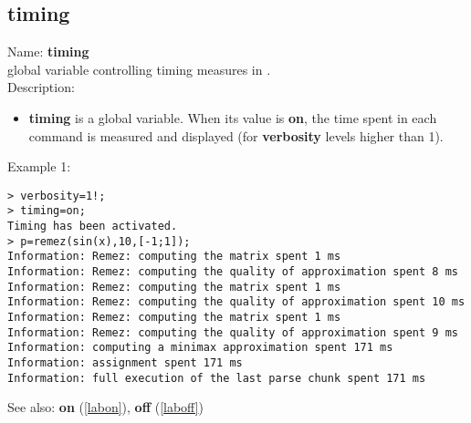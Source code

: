 \subsection{timing}
\label{labtiming}
\noindent Name: \textbf{timing}\\
global variable controlling timing measures in \sollya.\\
\noindent Description: \begin{itemize}

\item \textbf{timing} is a global variable. When its value is \textbf{on}, the time spent in each 
   command is measured and displayed (for \textbf{verbosity} levels higher than 1).
\end{itemize}
\noindent Example 1: 
\begin{center}\begin{minipage}{15cm}\begin{Verbatim}[frame=single]
> verbosity=1!;
> timing=on;
Timing has been activated.
> p=remez(sin(x),10,[-1;1]);
Information: Remez: computing the matrix spent 1 ms
Information: Remez: computing the quality of approximation spent 8 ms
Information: Remez: computing the matrix spent 1 ms
Information: Remez: computing the quality of approximation spent 10 ms
Information: Remez: computing the matrix spent 1 ms
Information: Remez: computing the quality of approximation spent 9 ms
Information: computing a minimax approximation spent 171 ms
Information: assignment spent 171 ms
Information: full execution of the last parse chunk spent 171 ms
\end{Verbatim}
\end{minipage}\end{center}
See also: \textbf{on} (\ref{labon}), \textbf{off} (\ref{laboff})
